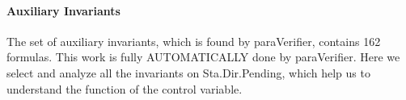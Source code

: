 \documentclass{llncs-new}
\begin{document}









\vspace{-10pt}

\paragraph{Auxiliary Invariants }
The set of auxiliary invariants, which is found by {\sf paraVerifier}, contains 162 formulas. This work is  fully AUTOMATICALLY  done by {\sf paraVerifier}.  Here we select and analyze all the invariants on Sta.Dir.Pending, which help us to understand the function of the control variable.
\end{document}
